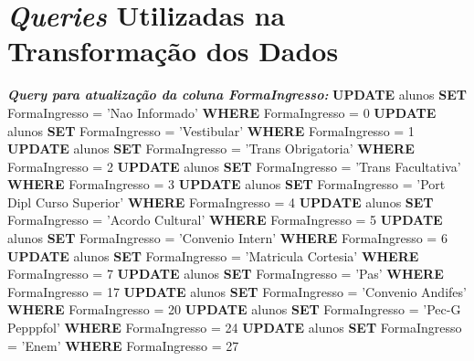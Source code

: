 \chapter{\textit{Queries} Utilizadas na Transformação dos Dados}  \label{apendiceE}


\noindent \textbf{\textit{Query para atualização da coluna \textit{FormaIngresso}:}} \newline
\textbf{UPDATE} alunos \textbf{SET} FormaIngresso = 'Nao Informado' \textbf{WHERE} FormaIngresso = 0 \newline
\textbf{UPDATE} alunos \textbf{SET} FormaIngresso = 'Vestibular' \textbf{WHERE} FormaIngresso = 1 \newline
\textbf{UPDATE} alunos \textbf{SET} FormaIngresso = 'Trans Obrigatoria' \textbf{WHERE} FormaIngresso = 2 \newline
\textbf{UPDATE} alunos \textbf{SET} FormaIngresso = 'Trans Facultativa' \textbf{WHERE} FormaIngresso = 3 \newline
\textbf{UPDATE} alunos \textbf{SET} FormaIngresso = 'Port Dipl Curso Superior' \textbf{WHERE} FormaIngresso = 4 \newline
\textbf{UPDATE} alunos \textbf{SET} FormaIngresso = 'Acordo Cultural' \textbf{WHERE} FormaIngresso = 5 \newline
\textbf{UPDATE} alunos \textbf{SET} FormaIngresso = 'Convenio Intern' \textbf{WHERE} FormaIngresso = 6 \newline
\textbf{UPDATE} alunos \textbf{SET} FormaIngresso = 'Matricula Cortesia' \textbf{WHERE} FormaIngresso = 7 \newline
\textbf{UPDATE} alunos \textbf{SET} FormaIngresso = 'Pas' \textbf{WHERE} FormaIngresso = 17 \newline
\textbf{UPDATE} alunos \textbf{SET} FormaIngresso = 'Convenio Andifes' \textbf{WHERE} FormaIngresso = 20 \newline
\textbf{UPDATE} alunos \textbf{SET} FormaIngresso = 'Pec-G Pepppfol' \textbf{WHERE} FormaIngresso = 24 \newline
\textbf{UPDATE} alunos \textbf{SET} FormaIngresso = 'Enem' \textbf{WHERE} FormaIngresso = 27 \newline


